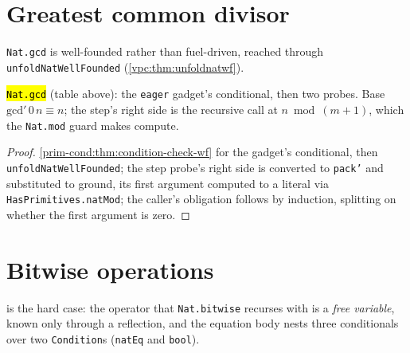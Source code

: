 \section{Greatest common divisor}

\texttt{Nat.gcd} is well-founded rather than fuel-driven, reached through
\texttt{unfoldNatWellFounded} (\ref{vpc:thm:unfoldnatwf}).

\begin{theorem}
  \label{prim-gcd:thm:checknatgcd-wf}
  \leanok

   \hl{\texttt{Nat.gcd}} (table above): the \texttt{eager} gadget's conditional,
  then two probes.
  Base $\mathrm{gcd}'\,0\,n \equiv n$; the step's right side is the recursive call at $n \bmod
  (m{+}1)$, which the \texttt{Nat.mod} guard makes compute.
\end{theorem}
\begin{proof}
  \leanok
   \ref{prim-cond:thm:condition-check-wf} for the gadget's conditional, then
  \texttt{unfoldNatWellFounded}; the step probe's right side is converted to \texttt{pack'} and
  substituted to ground, its first argument computed to a literal via
  \texttt{HasPrimitives.natMod}; the caller's obligation follows by induction, splitting on
  whether the first argument is zero.
\end{proof}

\section{Bitwise operations}

 is the hard case: the operator
that \texttt{Nat.bitwise} recurses with is a \emph{free variable}, known only through a reflection, and
the equation body nests three conditionals over two \texttt{Condition}s (\texttt{natEq} and
\texttt{bool}).

